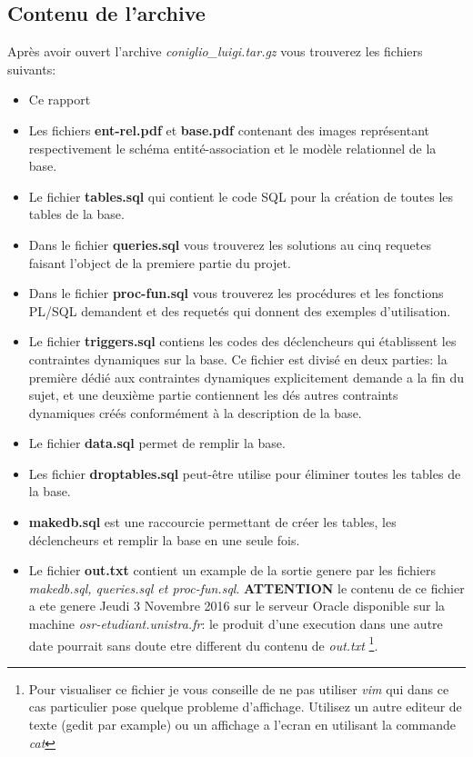 \documentclass[twoside,openright,a4paper,11pt,french]{article}
\begin{document}
\subsection{Contenu de l'archive}
Après avoir ouvert l'archive {\it coniglio\_luigi.tar.gz} vous
trouverez les fichiers suivants:
\smallbreak
\begin{itemize}
\item Ce rapport
\item Les fichiers {\bf ent-rel.pdf} et {\bf base.pdf} contenant des images
      représentant respectivement le schéma entité-association et le modèle
      relationnel de la base.
\item Le fichier {\bf tables.sql} qui contient le code SQL pour la création 
      de toutes les tables de la base.
\item Dans le fichier {\bf queries.sql} vous trouverez les solutions
      au cinq requetes faisant l'object de la premiere partie du projet.
\item Dans le fichier {\bf proc-fun.sql} vous trouverez les procédures et 
      les fonctions PL/SQL demandent et des requetés qui donnent des exemples d'utilisation.
\item Le fichier {\bf triggers.sql} contiens les codes des déclencheurs qui
      établissent les contraintes dynamiques sur la base. Ce fichier est divisé en
      deux parties: la première dédié aux contraintes dynamiques explicitement
      demande a la fin du sujet, et une deuxième partie contiennent les dés autres
      contraints dynamiques créés conformément à la description de la base.
\item Le fichier {\bf data.sql} permet de remplir la base.
\item Les fichier {\bf droptables.sql} peut-être utilise pour éliminer toutes 
      les tables de la base.
\item {\bf makedb.sql} est une raccourcie permettant de créer les tables, les 
      déclencheurs et remplir la base en une seule fois.
\item Le fichier {\bf out.txt} contient un example de la sortie genere par 
      les fichiers {\it makedb.sql, queries.sql et proc-fun.sql}. {\bf ATTENTION} le 
      contenu de ce fichier a ete genere Jeudi 3 Novembre 2016 sur le serveur Oracle
      disponible sur la machine {\it osr-etudiant.unistra.fr}: le produit
      d'une execution dans une autre date pourrait sans doute etre different du 
      contenu de {\it out.txt}
      \footnote{Pour visualiser ce fichier je vous conseille de ne pas utiliser
{\it vim} qui dans ce cas particulier pose quelque probleme d'affichage.
Utilisez un autre editeur de texte (gedit par example) ou un affichage a
l'ecran en utilisant la commande {\it cat}}.
\end{itemize}
\end{document}

